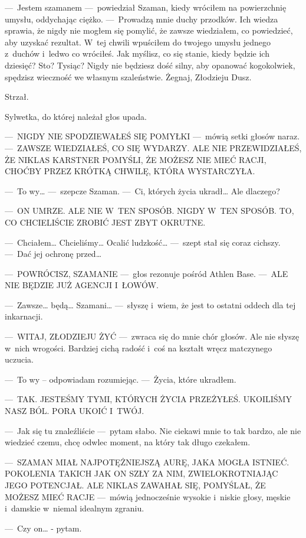 ---~Jestem szamanem ---~powiedział Szaman, kiedy wróciłem na powierzchnię umysłu, oddychając ciężko. ---~Prowadzą mnie duchy przodków. Ich wiedza sprawia, że nigdy nie mogłem się pomylić, że zawsze wiedziałem, co powiedzieć, aby uzyskać rezultat. W~tej chwili wpuściłem do twojego umysłu jednego z~duchów i~ledwo co wróciłeś. Jak myślisz, co się stanie, kiedy będzie ich dziesięć? Sto? Tysiąc? Nigdy nie będziesz dość silny, aby opanować kogokolwiek, spędzisz wieczność we własnym szaleństwie. Żegnaj, Złodzieju Dusz.

Strzał.

Sylwetka, do której należał głos upada.

---~NIGDY NIE SPODZIEWAŁEŚ SIĘ POMYŁKI ---~mówią setki głosów naraz. ---~ZAWSZE WIEDZIAŁEŚ, CO SIĘ WYDARZY. ALE NIE PRZEWIDZIAŁEŚ, ŻE NIKLAS KARSTNER POMYŚLI, ŻE MOŻESZ NIE MIEĆ RACJI, CHOĆBY PRZEZ KRÓTKĄ CHWILĘ, KTÓRA WYSTARCZYŁA.

---~To wy… ---~szepcze Szaman. ---~Ci, których życia ukradł… Ale dlaczego?

---~ON UMRZE. ALE NIE W~TEN SPOSÓB. NIGDY W~TEN SPOSÓB. TO, CO CHCIELIŚCIE ZROBIĆ JEST ZBYT OKRUTNE.

---~Chciałem… Chcieliśmy… Ocalić ludzkość… ---~szept stał się coraz cichszy. ---~Dać jej ochronę przed…

---~POWRÓCISZ, SZAMANIE ---~głos rezonuje pośród Athlen Base. ---~ALE NIE BĘDZIE JUŻ AGENCJI I~ŁOWÓW.

---~Zawsze… będą… Szamani… ---~słyszę i~wiem, że jest to ostatni oddech dla tej inkarnacji.

---~WITAJ, ZŁODZIEJU ŻYĆ ---~zwraca się do mnie chór głosów. Ale nie słyszę w~nich wrogości. Bardziej cichą radość i~coś na kształt wręcz matczynego uczucia.

---~To wy – odpowiadam rozumiejąc. ---~Życia, które ukradłem.

---~TAK. JESTEŚMY TYMI, KTÓRYCH ŻYCIA PRZEŻYŁEŚ. UKOILIŚMY NASZ BÓL. PORA UKOIĆ I~TWÓJ.

---~Jak się tu znaleźliście ---~pytam słabo. Nie ciekawi mnie to tak bardzo, ale nie wiedzieć czemu, chcę odwlec moment, na który tak długo czekałem.

---~SZAMAN MIAŁ NAJPOTĘŻNIEJSZĄ AURĘ, JAKA MOGŁA ISTNIEĆ. POKOLENIA TAKICH JAK ON SZŁY ZA NIM, ZWIELOKROTNIAJĄC JEGO POTENCJAŁ. ALE NIKLAS ZAWAHAŁ SIĘ, POMYŚLAŁ, ŻE MOŻESZ MIEĆ RACJE ---~mówią jednocześnie wysokie i~niskie głosy, męskie i~damskie w~niemal idealnym zgraniu.

---~Czy on… - pytam.

